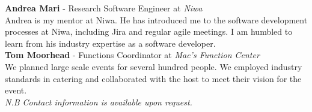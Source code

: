 \documentclass[9pt]{developercv}
\begin{document}

\textbf{Andrea Mari} - Research Software Engineer at \emph{Niwa} \\
Andrea is my mentor at Niwa. He has introduced me to the software development processes at Niwa, including Jira and regular agile meetings. I am humbled to learn from his industry expertise as a software developer.\\

\textbf{Tom Moorhead} - Functions Coordinator at \emph{Mac's Function Center} \\
We planned large scale events for several hundred people. We employed industry standards in catering and collaborated with the host to meet their vision for the event. \\


\emph{N.B Contact information is available upon request.}



\end{document}
